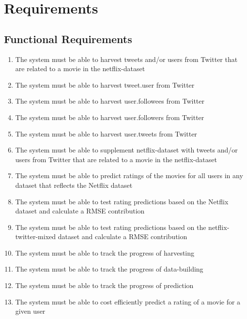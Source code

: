 
\appendix
\clearpage
{}
\setcounter{page}{1}



\chapter{Requirements}\label{app:req}
\section{Functional Requirements}
\begin{enumerate}[label=\bfseries FR \arabic*:]
  \item The system must be able to harvest tweets and/or users from Twitter that are related to a movie in the netflix-dataset
  \item The system must be able to harvest tweet.user from Twitter
  \item The system must be able to harvest user.followees from Twitter
  \item The system must be able to harvest user.followers from Twitter
  \item The system must be able to harvest user.tweets from Twitter
  \item The system must be able to supplement netflix-dataset with tweets and/or users from Twitter that are related to a movie in the netflix-dataset
  \item The system must be able to predict ratings of the movies for all users in any dataset that reflects the Netflix dataset
  \item The system must be able to test rating predictions based on the Netflix dataset and calculate a RMSE contribution
  \item The system must be able to test rating predictions based on the netflix-twitter-mixed dataset and calculate a RMSE contribution
  \item The system must be able to track the progress of harvesting
  \item The system must be able to track the progress of data-building
  \item The system must be able to track the progress of prediction
  \item The system must be able to cost efficiently predict a rating of a movie for a given user
\end{enumerate}

